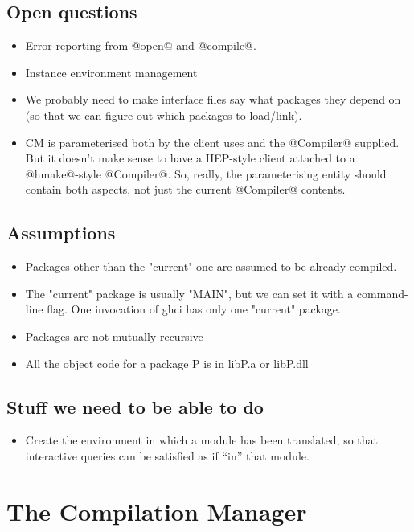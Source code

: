 \documentclass[11pt]{article}
\begin{document}
\subsection{Open questions}
\begin{itemize}
\item
  Error reporting from @open@ and @compile@.
\item
  Instance environment management
\item
  We probably need to make interface files say what
  packages they depend on (so that we can figure out
  which packages to load/link).
\item 
  CM is parameterised both by the client uses and the @Compiler@
  supplied.  But it doesn't make sense to have a HEP-style client
  attached to a @hmake@-style @Compiler@.  So, really, the 
  parameterising entity should contain both aspects, not just the
  current @Compiler@ contents.
\end{itemize}

\subsection{Assumptions}

\begin{itemize}
\item Packages other than the "current" one are assumed to be 
  already compiled.  
\item
  The "current" package is usually "MAIN",
  but we can set it with a command-line flag.
  One invocation of ghci has only one "current" package.
\item
  Packages are not mutually recursive
\item
  All the object code for a package P is in libP.a or libP.dll
\end{itemize}

\subsection{Stuff we need to be able to do}
\begin{itemize}
\item Create the environment in which a module has been translated,
      so that interactive queries can be satisfied as if ``in'' that
      module.
\end{itemize}

\section{The Compilation Manager}
\end{document}

